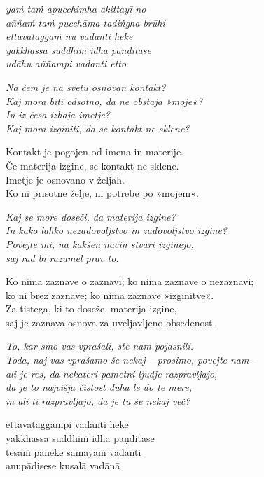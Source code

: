 \emph{yaṁ taṁ apucchimha akittayī no}\\
\emph{aññaṁ taṁ pucchāma tadiṅgha brūhi}\\
\emph{ettāvataggaṁ nu vadanti heke}\\
\emph{yakkhassa suddhiṁ idha paṇḍitāse}\\
\emph{udāhu aññampi vadanti etto}


\clearpage

\emph{Na čem je na svetu osnovan kontakt?\\
Kaj mora biti odsotno, da ne obstaja »moje«?}\\
\emph{In iz česa izhaja imetje?}\\
\emph{Kaj mora izginiti, da se kontakt ne sklene?}

Kontakt je pogojen od imena in materije.\\
Če materija izgine, se kontakt ne sklene.\\
Imetje je osnovano v željah.\\
Ko ni prisotne želje, ni potrebe po »mojem«.

\emph{Kaj se more doseči, da materija izgine?}\\
\emph{In kako lahko nezadovoljstvo in zadovoljstvo izgine?}\\
\emph{Povejte mi, na kakšen način stvari izginejo,}\\
\emph{saj rad bi razumel prav to.}

Ko nima zaznave o zaznavi; ko nima zaznave o nezaznavi;\\
ko ni brez zaznave; ko nima zaznave »izginitve«.\\
Za tistega, ki to doseže, materija izgine,\\
saj je zaznava osnova za uveljavljeno obsedenost.

\emph{To, kar smo vas vprašali, ste nam pojasnili.}\\
\emph{Toda, naj vas vprašamo še nekaj -- prosimo, povejte nam --}\\
\emph{ali je res, da nekateri pametni ljudje razpravljajo,}\\
\emph{da je to najvišja čistost duha le do te mere,}\\
\emph{in ali ti razpravljajo, da je tu še nekaj več?}


\clearpage

ettāvataggampi vadanti heke\\
yakkhassa suddhiṁ idha paṇḍitāse\\
tesaṁ paneke samayaṁ vadanti\\
anupādisese kusalā vadānā

